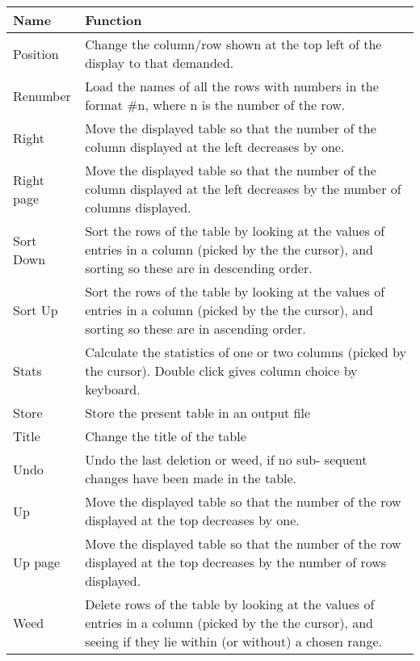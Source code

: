 \begin{small}
{{\begin{tabular}{|l|p{4.5in}|}\hline
 Name      &    Function \\ \hline
 Position    &  Change the column/row shown at the top left
                of the display to that demanded. \\
 Renumber    &  Load the names of all the rows with numbers
                in the format \#n, where n is the number of
                the row. \\
 Right       &  Move the displayed table so that the number
                of the column displayed at the left decreases
                by one. \\
 Right page  &  Move the displayed table so that the number
                of the column displayed at the left decreases
                by the number of columns displayed. \\
 Sort Down   &  Sort the rows of the table by looking at the
                values of entries in a column (picked by the
                the cursor), and sorting so these are in
                descending order. \\
 Sort Up     &  Sort the rows of the table by looking at the
                values of entries in a column (picked by the
                the cursor), and sorting so these are in
                ascending order. \\
 Stats       &  Calculate the statistics of one or two columns
                (picked by the cursor). Double click gives
                column choice by keyboard. \\
 Store       &  Store the present table in an output file \\
 Title       &  Change the title of the table \\
 Undo        &  Undo the last deletion or weed, if no sub-
                sequent changes have been made in the table. \\
 Up          &  Move the displayed table so that the number
                of the row displayed at the top decreases
                by one. \\
 Up page     &  Move the displayed table so that the number
                of the row displayed at the top decreases
                by the number of rows displayed.  \\
 Weed        &  Delete rows of the table by looking at the
                values of entries in a column (picked by the
                the cursor), and seeing if they lie within
                (or without) a chosen range. \\ \hline
\end{tabular}
 
}}
\end{small}
